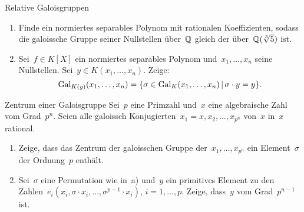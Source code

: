 \documentclass{algblatt}
\begin{document}
\begin{aufgabe}{Relative Galoisgruppen}
\begin{enumerate}
\item Finde ein normiertes separables Polynom mit rationalen Koeffizienten,
sodass die galoissche Gruppe seiner Nullstellen über~$\mathbb{Q}$ gleich der
über~$\mathbb{Q}(\sqrt[3]{5})$ ist.
\item Sei~$f \in K[X]$ ein normiertes separables Polynom und~$x_1,\ldots,x_n$
seine Nullstellen. Sei~$y \in K(x_1,\ldots,x_n)$. Zeige:
\[ \mathrm{Gal}_{K(y)}(x_1,\ldots,x_n) = \{ \sigma \in \mathrm{Gal}_K(x_1,\ldots,x_n) \,|\,
\sigma \cdot y = y \}. \]
\end{enumerate}
\end{aufgabe}

\begin{aufgabe}{Zentrum einer Galoisgruppe}
Sei~$p$ eine Primzahl und~$x$ eine algebraische Zahl vom Grad~$p^n$. Seien alle
galoissch Konjugierten~$x_1 = x, x_2, \ldots, x_{p^n}$ von~$x$ in~$x$ rational.
\begin{enumerate}
\item Zeige, dass das Zentrum der galoisschen Gruppe der~$x_1,\ldots,x_{p^n}$ ein
Element~$\sigma$ der Ordnung~$p$ enthält.
\item Sei~$\sigma$ eine Permutation wie in~a) und~$y$ ein primitives Element
zu den Zahlen~$e_i(x_i,\sigma\cdot x_i,\ldots,\sigma^{p-1}\cdot x_i)$, $i =
1,\ldots,p$. Zeige, dass~$y$ vom Grad~$p^{n-1}$ ist.
\end{enumerate}
\end{aufgabe}
\end{document}
